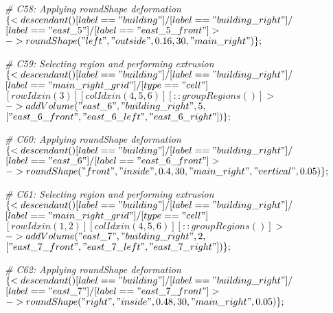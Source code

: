 \noindent \textit{\# C58: Applying roundShape deformation}\\
$\{< descendant() [label=="building"] / [label=="building\_right"] / $\\
$[label=="east\_5"] / [label=="east\_5\_front"] > $\\
$-> roundShape("left", "outside", 0.16, 30, "main\_right")\};$

\noindent \textit{\# C59: Selecting region and performing extrusion}\\
$\{< descendant() [label=="building"] / [label=="building\_right"] / $\\
$[label=="main\_right\_grid"] / [type=="cell"] $\\
$[rowIdx in (3)] [colIdx in (4, 5, 6)] [::groupRegions()] > $\\
$-> addVolume("east\_6", "building\_right", 5, $\\
$["east\_6\_front", "east\_6\_left", "east\_6\_right"])\};$

\noindent \textit{\# C60: Applying roundShape deformation}\\
$\{< descendant() [label=="building"] / [label=="building\_right"] / $\\
$[label=="east\_6"] / [label=="east\_6\_front"] > $\\
$-> roundShape("front", "inside", 0.4, 30, "main\_right", "vertical", 0.05)\};$

\noindent \textit{\# C61: Selecting region and performing extrusion}\\
$\{< descendant() [label=="building"] / [label=="building\_right"] / $\\
$[label=="main\_right\_grid"] / [type=="cell"] $\\
$[rowIdx in (1, 2)] [colIdx in (4, 5, 6)] [::groupRegions()] > $\\
$-> addVolume("east\_7", "building\_right", 2, $\\
$["east\_7\_front", "east\_7\_left", "east\_7\_right"])\};$

\noindent \textit{\# C62: Applying roundShape deformation}\\
$\{< descendant() [label=="building"] / [label=="building\_right"] / $\\
$[label=="east\_7"] / [label=="east\_7\_front"] > $\\
$-> roundShape("right", "inside", 0.48, 30, "main\_right", 0.05)\};$
